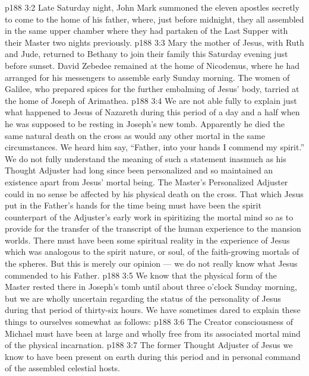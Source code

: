 \vs p188 3:2 Late Saturday night, John Mark summoned the eleven apostles secretly to come to the home of his father, where, just before midnight, they all assembled in the same upper chamber where they had partaken of the Last Supper with their Master two nights previously.
\vs p188 3:3 Mary the mother of Jesus, with Ruth and Jude, returned to Bethany to join their family this Saturday evening just before sunset. David Zebedee remained at the home of Nicodemus, where he had arranged for his messengers to assemble early Sunday morning. The women of Galilee, who prepared spices for the further embalming of Jesus’ body, tarried at the home of Joseph of Arimathea.
\vs p188 3:4 \pc We are not able fully to explain just what happened to Jesus of Nazareth during this period of a day and a half when he was supposed to be resting in Joseph’s new tomb. Apparently he died the same natural death on the cross as would any other mortal in the same circumstances. We heard him say, \textcolor{ubdarkred}{“Father, into your hands I commend my spirit.”} We do not fully understand the meaning of such a statement inasmuch as his Thought Adjuster had long since been personalized and so maintained an existence apart from Jesus’ mortal being. The Master’s Personalized Adjuster could in no sense be affected by his physical death on the cross. That which Jesus put in the Father’s hands for the time being must have been the spirit counterpart of the Adjuster’s early work in spiritizing the mortal mind so as to provide for the transfer of the transcript of the human experience to the mansion worlds. There must have been some spiritual reality in the experience of Jesus which was analogous to the spirit nature, or soul, of the faith\hyp{}growing mortals of the spheres. But this is merely our opinion --- we do not really know what Jesus commended to his Father.
\vs p188 3:5 We know that the physical form of the Master rested there in Joseph’s tomb until about three o’clock Sunday morning, but we are wholly uncertain regarding the status of the personality of Jesus during that period of thirty\hyp{}six hours. We have sometimes dared to explain these things to ourselves somewhat as follows:
\vs p188 3:6 \bibnobreakspace The Creator consciousness of Michael must have been at large and wholly free from its associated mortal mind of the physical incarnation.
\vs p188 3:7 \pc {}\bibnobreakspace The former Thought Adjuster of Jesus we know to have been present on earth during this period and in personal command of the assembled celestial hosts.
